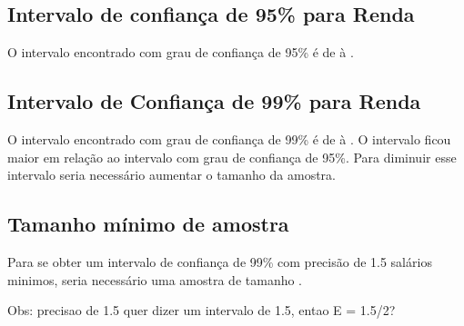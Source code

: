 

\subsection{Intervalo de confiança de 95\% para Renda}
O intervalo encontrado com grau de confiança de 95\% é de \TRESicmin à \TRESicmax.

\subsection{Intervalo de Confiança de 99\% para Renda}
O intervalo encontrado com grau de confiança de 99\% é de \TRESicNoveNoveMin à \TRESicNoveNoveMax.
O intervalo ficou maior em relação ao intervalo com grau de confiança de 95\%.{}
Para diminuir esse intervalo seria necessário aumentar o tamanho da amostra.

\subsection{Tamanho mínimo de amostra}
Para se obter um intervalo de confiança de 99\% com precisão de 1.5 salários
minimos, seria necessário uma amostra de tamanho \TRESnZero.

Obs: precisao de 1.5 quer dizer um intervalo de 1.5, entao E = 1.5/2?
